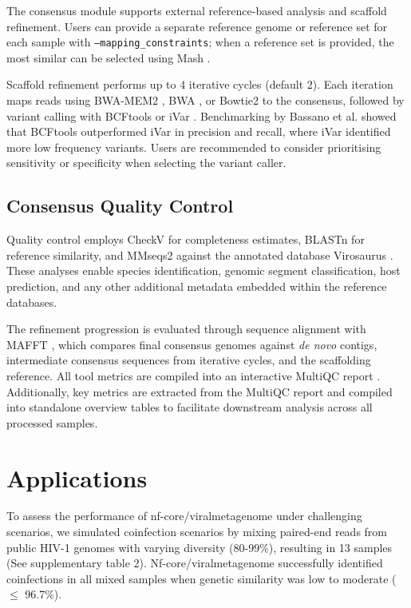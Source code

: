 The consensus module supports external reference-based analysis and scaffold refinement. Users can provide a separate reference genome or reference set for each sample with \texttt{--mapping\_constraints}; when a reference set is provided, the most similar can be selected using Mash \citep{Ondov2019-bo}.

Scaffold refinement performs up to 4 iterative cycles (default 2). Each iteration maps reads using BWA-MEM2 \citep{Vasimuddin2019-rb}, BWA \citep{Li2013-pp}, or Bowtie2 \citep{Langmead2019-wx} to the consensus, followed by variant calling with BCFtools \citep{Danecek2021-je} or iVar \citep{Grubaugh2019-xd}. Benchmarking by Bassano et al. \citep{Bassano2022-cl} showed that BCFtools outperformed iVar in precision and recall, where iVar identified more low frequency variants. Users are recommended to consider prioritising sensitivity or specificity when selecting the variant caller.

\subsection{Consensus Quality Control}

Quality control employs CheckV \citep{Nayfach2021-wl} for completeness estimates, BLASTn \citep{Altschul1990-sy} for reference similarity, and MMseqs2 \citep{Steinegger2017-ci} against the annotated database Virosaurus \citep{Gleizes2020-rq}. These analyses enable species identification, genomic segment classification, host prediction, and any other additional metadata embedded within the reference databases.

The refinement progression is evaluated through sequence alignment with MAFFT \citep{Katoh2002-ox}, which compares final consensus genomes against \textit{de novo} contigs, intermediate consensus sequences from iterative cycles, and the scaffolding reference. All tool metrics are compiled into an interactive MultiQC report \citep{Ewels2016-hs}. Additionally, key metrics are extracted from the MultiQC report and compiled into standalone overview tables to facilitate downstream analysis across all processed samples.

\section{Applications}

To assess the performance of nf-core/viralmetagenome under challenging scenarios, we simulated coinfection scenarios by mixing paired-end reads from public HIV-1 genomes with varying diversity (80-99\%), resulting in 13 samples (See supplementary table 2). Nf-core/viralmetagenome successfully identified coinfections in all mixed samples when genetic similarity was low to moderate ($\leq$ 96.7\%).

